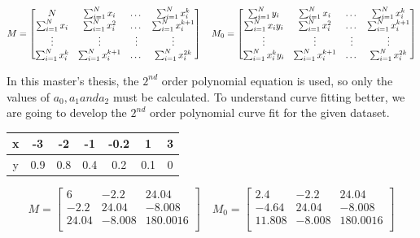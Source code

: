 \[
 M = \begin{bmatrix}
N & $$\sum_{i=1}^{N} x_{i}$$ & $\dots$ & $$\sum_{i=1}^{N} x_{i}^{k}$$ \\
$$\sum_{i=1}^{N} x_{i}$$ & $$\sum_{i=1}^{N} x_{i}^2$$ & $\dots$ & $$\sum_{i=1}^{N} x_{i}^{k+1}$$ \\
$\vdots$ & $\vdots$ & $\vdots$ & $\vdots$ \\
$$\sum_{i=1}^{N} x_{i}^{k}$$ & $$\sum_{i=1}^{N} x_{i}^{k+1}$$ & $\dots$ & $$\sum_{i=1}^{N} x_{i}^{2k}$$ \\

\end{bmatrix} \quad
 M_{0} = \begin{bmatrix}
$$\sum_{i=1}^{N} y_{i}$$ & $$\sum_{i=1}^{N} x_{i}$$ & $\dots$ & $$\sum_{i=1}^{N} x_{i}^{k}$$ \\
$$\sum_{i=1}^{N} x_{i}y_{i}$$ & $$\sum_{i=1}^{N} x_{i}^2$$ & $\dots$ & $$\sum_{i=1}^{N} x_{i}^{k+1}$$ \\
$\vdots$ & $\vdots$ & $\vdots$ & $\vdots$ \\
$$\sum_{i=1}^{N} x_{i}^{k}y_{i}$$ & $$\sum_{i=1}^{N} x_{i}^{k+1}$$ & $\dots$ & $$\sum_{i=1}^{N} x_{i}^{2k}$$ \\

\end{bmatrix}
\]

In this master's thesis, the $ 2^{nd} $ order polynomial equation is used, so only the values of $ a_{0}, a_{1} and a_{2} $ must be calculated. To understand curve fitting better, we are going to develop the $ 2^{nd} $ order polynomial curve fit for the given dataset.

\begin{center}
  \begin{tabular}{ | c | c | c | c | c | c | c |}
    \hline
    x & -3  &  -2  &  -1  & -0.2  &  1  &  3 \\ \hline
    y & 0.9 &  0.8 &  0.4 &  0.2  & 0.1 &  0 \\
    \hline
  \end{tabular}
\end{center}

\[
 M = \begin{bmatrix}
6 & -2.2 & 24.04 \\
-2.2 & 24.04 & -8.008 \\
24.04 & -8.008 & 180.0016 \\

\end{bmatrix} \quad
 M_{0} = \begin{bmatrix}
2.4 & -2.2 & 24.04 \\
-4.64 & 24.04 & -8.008 \\
11.808 & -8.008 & 180.0016 \\

\end{bmatrix} 
\]

